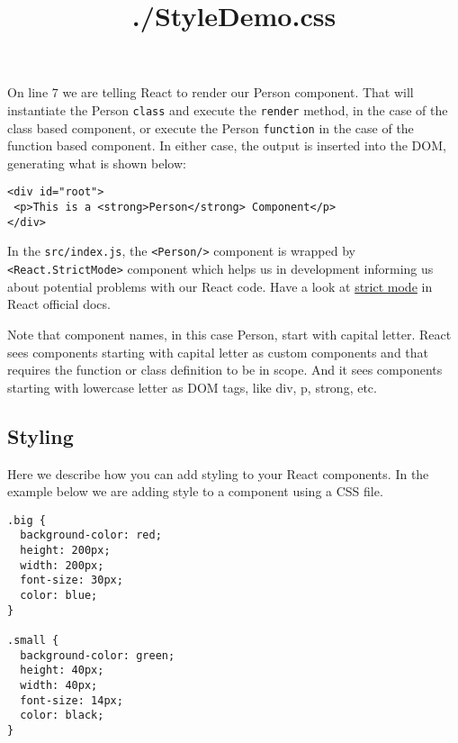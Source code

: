 \documentclass[a4paper, oneside, titlepage, 12pt]{book}
\begin{document}
On line 7 we are telling React to render our Person component. That will instantiate the Person \texttt{class} and execute the \texttt{render} method, in the case of the class based component, or execute the Person \texttt{function} in the case of the function based component. In either case, the output is inserted into the DOM, generating what is shown below:

\begin{verbatim}
<div id="root">
 <p>This is a <strong>Person</strong> Component</p>
</div>
\end{verbatim}

In the \texttt{src/index.js}, the \texttt{<Person/>} component is wrapped by \texttt{<React.StrictMode>} component which helps us in development informing us about potential problems with our React code. Have a look at \href{https://reactjs.org/docs/strict-mode.html}{strict mode} in React official docs.

Note that component names, in this case Person, start with capital letter. React sees components starting with capital letter as custom components and that requires the function or class definition to be in scope. And it sees components starting with lowercase letter as DOM tags, like div, p, strong, etc.

\subsection{Styling}

Here we describe how you can add styling to your React components. In the example below we are adding style to a component using a CSS file.

\begin{listing}[H]
\title{./StyleDemo.css}
\begin{verbatim}
.big {
  background-color: red;
  height: 200px;
  width: 200px;
  font-size: 30px;
  color: blue;
}

.small {
  background-color: green;
  height: 40px;
  width: 40px;
  font-size: 14px;
  color: black;
}
\end{verbatim}
\end{listing}
\end{document}
